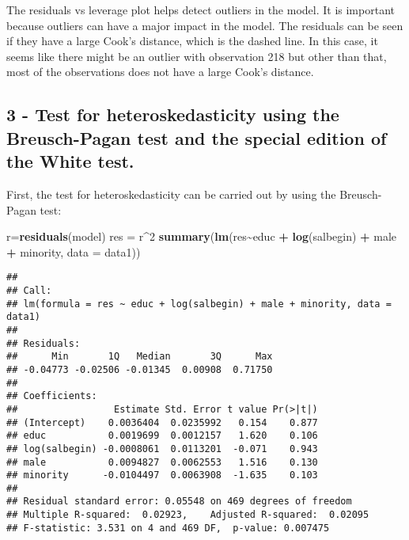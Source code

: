 \documentclass[
]{article}
\newenvironment{Shaded}{\begin{snugshade}}{\end{snugshade}}
\newcommand{\AttributeTok}[1]{\textcolor[rgb]{0.13,0.29,0.53}{#1}}
\newcommand{\DecValTok}[1]{\textcolor[rgb]{0.00,0.00,0.81}{#1}}
\newcommand{\FunctionTok}[1]{\textcolor[rgb]{0.13,0.29,0.53}{\textbf{#1}}}
\newcommand{\NormalTok}[1]{#1}
\newcommand{\OtherTok}[1]{\textcolor[rgb]{0.56,0.35,0.01}{#1}}
\newcommand{\SpecialCharTok}[1]{\textcolor[rgb]{0.81,0.36,0.00}{\textbf{#1}}}
\begin{document}
The residuals vs leverage plot helps detect outliers in the model. It is
important because outliers can have a major impact in the model. The
residuals can be seen if they have a large Cook's distance, which is the
dashed line. In this case, it seems like there might be an outlier with
observation 218 but other than that, most of the observations does not
have a large Cook's distance.

\subsection{3 - Test for heteroskedasticity using the Breusch-Pagan test
and the special edition of the White
test.}\label{test-for-heteroskedasticity-using-the-breusch-pagan-test-and-the-special-edition-of-the-white-test.}

First, the test for heteroskedasticity can be carried out by using the
Breusch-Pagan test:

\begin{Shaded}
\begin{Highlighting}[]
\NormalTok{r}\OtherTok{=}\FunctionTok{residuals}\NormalTok{(model)}
\NormalTok{res }\OtherTok{=}\NormalTok{ r}\SpecialCharTok{\^{}}\DecValTok{2}
\FunctionTok{summary}\NormalTok{(}\FunctionTok{lm}\NormalTok{(res}\SpecialCharTok{\textasciitilde{}}\NormalTok{educ }\SpecialCharTok{+} \FunctionTok{log}\NormalTok{(salbegin) }\SpecialCharTok{+}\NormalTok{ male }\SpecialCharTok{+}\NormalTok{ minority, }\AttributeTok{data =}\NormalTok{ data1))}
\end{Highlighting}
\end{Shaded}

\begin{verbatim}
## 
## Call:
## lm(formula = res ~ educ + log(salbegin) + male + minority, data = data1)
## 
## Residuals:
##      Min       1Q   Median       3Q      Max 
## -0.04773 -0.02506 -0.01345  0.00908  0.71750 
## 
## Coefficients:
##                 Estimate Std. Error t value Pr(>|t|)
## (Intercept)    0.0036404  0.0235992   0.154    0.877
## educ           0.0019699  0.0012157   1.620    0.106
## log(salbegin) -0.0008061  0.0113201  -0.071    0.943
## male           0.0094827  0.0062553   1.516    0.130
## minority      -0.0104497  0.0063908  -1.635    0.103
## 
## Residual standard error: 0.05548 on 469 degrees of freedom
## Multiple R-squared:  0.02923,    Adjusted R-squared:  0.02095 
## F-statistic: 3.531 on 4 and 469 DF,  p-value: 0.007475
\end{verbatim}
\end{document}
